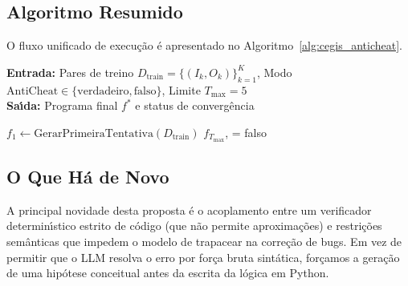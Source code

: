 \subsection{Algoritmo Resumido}

O fluxo unificado de execu\c{c}\~{a}o \'{e} apresentado no Algoritmo~\ref{alg:cegis_anticheat}.

\begin{algorithm}[h]
\caption{Ciclo CEGIS com op\c{c}\~{a}o de regras AntiCheat}
\label{alg:cegis_anticheat}
\small
\textbf{Entrada:} Pares de treino $D_{\text{train}} = \{(I_k, O_k)\}_{k=1}^K$, Modo $\text{AntiCheat} \in \{\text{verdadeiro}, \text{falso}\}$, Limite $T_{\max} = 5$\\
\textbf{Sa\'{\i}da:} Programa final $f^*$ e status de converg\^{e}ncia

$f_1 \gets \text{GerarPrimeiraTentativa}(D_{\text{train}})$\;
\Retorna $f_{T_{\max}}$,  = falso\;
\end{algorithm}

\subsection{O Que H\'{a} de Novo}

A principal novidade desta proposta \'{e} o acoplamento entre um verificador determin\'{\i}stico estrito de c\'{o}digo (que n\~{a}o permite aproxima\c{c}\~{o}es) e restri\c{c}\~{o}es sem\^{a}nticas que impedem o modelo de trapacear na corre\c{c}\~{a}o de bugs. Em vez de permitir que o LLM resolva o erro por for\c{c}a bruta sint\'{a}tica, for\c{c}amos a gera\c{c}\~{a}o de uma hip\'{o}tese conceitual antes da escrita da l\'{o}gica em Python.

